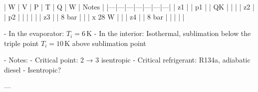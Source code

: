 | W | V | P | T | Q | W | Notes |
|---|---|---|---|---|---|---|
| z1 |   | p1 |   | QK |   |   |
| z2 |   | p2 |   |     |   |   |
| z3 |   | 8 bar |   |     | x 28 W |   |
| z4 |   | 8 bar |   |     |   |   |

- In the evaporator: \( T_i = 6 \, \text{K} \)  
- In the interior: Isothermal, sublimation below the triple point  
  \( T_i = 10 \, \text{K} \) above sublimation point  

- Notes:  
  - Critical point: 2 → 3 isentropic  
  - Critical refrigerant: R134a, adiabatic diesel  
  - Isentropic?  

---